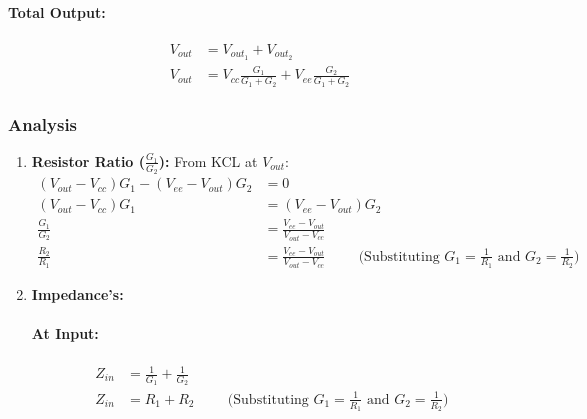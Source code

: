 \paragraph{Total Output:}
\begin{align*}
  V_{out} &= V_{out_1} + V_{out_2} \\
  V_{out} &= V_{cc} \frac{G_1}{G_1 + G_2} + V_{ee} \frac{G_2}{G_1 + G_2}
\end{align*}

\subsubsection{Analysis}
\begin{enumerate}
  \item \textbf{Resistor Ratio (\(\frac{G_1}{G_2}\)):}
    From KCL at \(V_{out}\):
    \begin{align*}
      (V_{out} - V_{cc})G_1 - (V_{ee} - V_{out})G_2 &= 0 \\
      (V_{out} - V_{cc})G_1 &= (V_{ee} - V_{out})G_2 \\
      \frac{G_1}{G_2} &= \frac{V_{ee} - V_{out}}{V_{out} - V_{cc}} \\
      \frac{R_2}{R_1} &= \frac{V_{ee} - V_{out}}{V_{out} - V_{cc}} \hspace{1cm} \text{(Substituting \(G_1 = \frac{1}{R_1}\) and \(G_2 = \frac{1}{R_2}\))}
    \end{align*}
  \item \textbf{Impedance's:}
    \paragraph{At Input:}
      \begin{align*}
        Z_{in} &= \frac{1}{G_1} + \frac{1}{G_2} \\
        Z_{in} &= R_1 + R_2 \hspace{1cm} \text{(Substituting \(G_1 = \frac{1}{R_1}\) and \(G_2 = \frac{1}{R_2}\))}
      \end{align*}

\end{enumerate}
